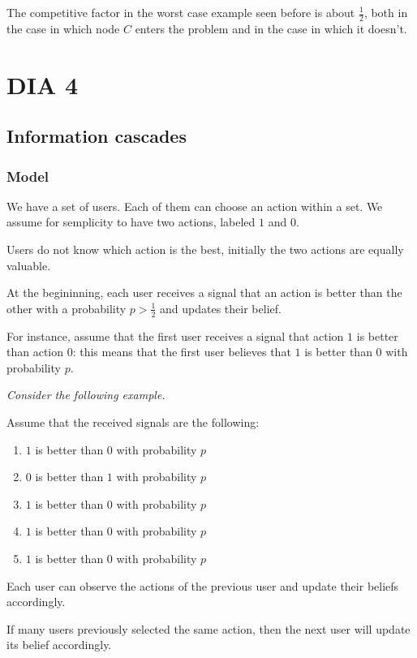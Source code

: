 \documentclass[10pt,a4paper]{article}
\begin{document}
The competitive factor in the worst case example seen before is about $\frac{1}{2}$, both in the case in which node $C$ enters the problem and in the case in which it doesn't.

\setcounter{section}{3}
\section{DIA 4}\label{dia-4}

\subsection{Information cascades}\label{information-cascades}

\subsubsection{Model}\label{model}

We have a set of users. Each of them can choose an action within a set. We assume for semplicity to have two actions, labeled $1$ and $0$.

Users do not know which action is the best, initially the two actions are equally valuable.

At the begininning, each user receives a signal that an action is better than the other with a probability $p > \frac{1}{2}$ and updates their belief.

For instance, assume that the first user receives a signal that action $1$ is better than action $0$: this means that the first user believes that $1$ is better than $0$ with probability $p$.

\textit{Consider the following example.}

Assume that the received signals are the following:
\begin{enumerate}
\item $1$ is better than $0$ with probability $p$
\item $0$ is better than $1$ with probability $p$
\item $1$ is better than $0$ with probability $p$
\item $1$ is better than $0$ with probability $p$
\item $1$ is better than $0$ with probability $p$
\end{enumerate}

Each user can observe the actions of the previous user and update their beliefs accordingly.

If many users previously selected the same action, then the next user will update its belief accordingly.
\end{document}

